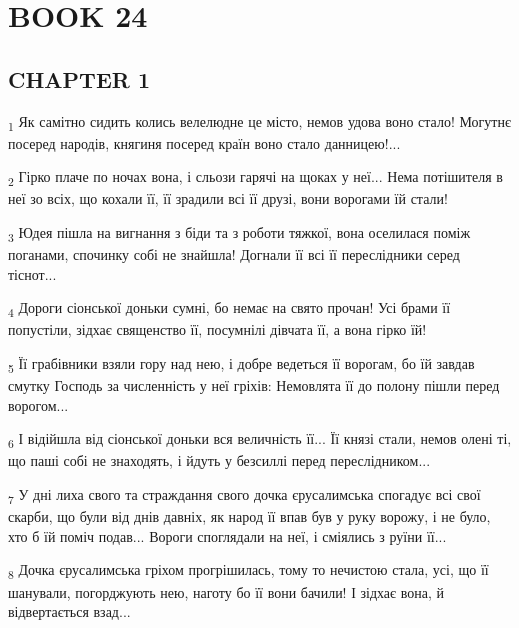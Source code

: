 \section{BOOK 24}
\subsection{CHAPTER 1}
\begin{tcolorbox}
\textsubscript{1} Як самітно сидить колись велелюдне це місто, немов удова воно стало! Могутнє посеред народів, княгиня посеред країн воно стало данницею!...
\end{tcolorbox}
\begin{tcolorbox}
\textsubscript{2} Гірко плаче по ночах вона, і сльози гарячі на щоках у неї... Нема потішителя в неї зо всіх, що кохали її, її зрадили всі її друзі, вони ворогами їй стали!
\end{tcolorbox}
\begin{tcolorbox}
\textsubscript{3} Юдея пішла на вигнання з біди та з роботи тяжкої, вона оселилася поміж поганами, спочинку собі не знайшла! Догнали її всі її переслідники серед тіснот...
\end{tcolorbox}
\begin{tcolorbox}
\textsubscript{4} Дороги сіонської доньки сумні, бо немає на свято прочан! Усі брами її попустіли, зідхає священство її, посумнілі дівчата її, а вона гірко їй!
\end{tcolorbox}
\begin{tcolorbox}
\textsubscript{5} Її грабівники взяли гору над нею, і добре ведеться її ворогам, бо їй завдав смутку Господь за численність у неї гріхів: Немовлята її до полону пішли перед ворогом...
\end{tcolorbox}
\begin{tcolorbox}
\textsubscript{6} І відійшла від сіонської доньки вся величність її... Її князі стали, немов олені ті, що паші собі не знаходять, і йдуть у безсиллі перед переслідником...
\end{tcolorbox}
\begin{tcolorbox}
\textsubscript{7} У дні лиха свого та страждання свого дочка єрусалимська спогадує всі свої скарби, що були від днів давніх, як народ її впав був у руку ворожу, і не було, хто б їй поміч подав... Вороги споглядали на неї, і сміялись з руїни її...
\end{tcolorbox}
\begin{tcolorbox}
\textsubscript{8} Дочка єрусалимська гріхом прогрішилась, тому то нечистою стала, усі, що її шанували, погорджують нею, наготу бо її вони бачили! І зідхає вона, й відвертається взад...
\end{tcolorbox}
